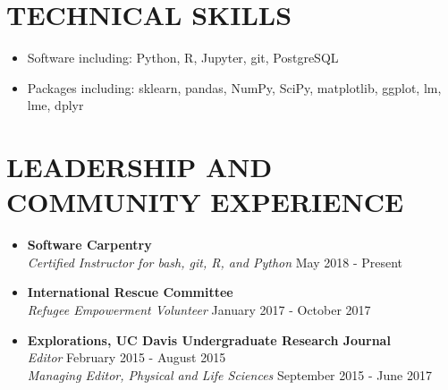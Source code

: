 \documentclass[line,margin,10pt]{res}
\begin{document}
\begin{resume}
 \section{TECHNICAL SKILLS} 
 \begin{itemize}[leftmargin=-2pt] \itemsep -2pt
\item [] Software including: Python, R, Jupyter, git, PostgreSQL
\item []Packages including: sklearn, pandas, NumPy, SciPy, matplotlib, ggplot, lm, lme, dplyr%
 \end{itemize}
 
\section{LEADERSHIP AND COMMUNITY EXPERIENCE}
\begin{itemize}\itemsep -2pt

\item [] \textbf{Software Carpentry} \\ {\sl Certified Instructor for bash, git, R, and Python} \hfill May 2018 - Present

\item [] \textbf{International Rescue Committee} \\ {\sl Refugee Empowerment Volunteer} \hfill January 2017 - October 2017

\item [] \textbf{Explorations, UC Davis Undergraduate Research Journal} \\
{\sl Editor} \hfill February 2015 - August 2015\\
{\sl Managing Editor, Physical and Life Sciences} \hfill September 2015 - June 2017
  



\end{itemize}
 

\end{resume}
\end{document}
